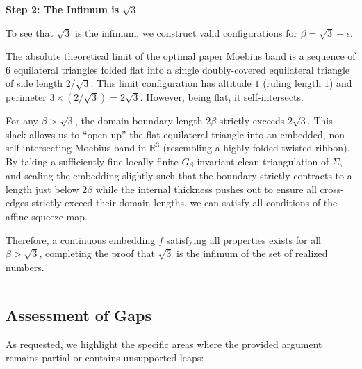 \documentclass[12pt]{article}
\begin{document}
\vspace{1em}

\noindent\textbf{Step 2: The Infimum is $\sqrt{3}$}

\vspace{0.5em}

To see that $\sqrt{3}$ is the infimum, we construct valid configurations for $\beta = \sqrt{3} + \epsilon$.

The absolute theoretical limit of the optimal paper Moebius band is a sequence of $6$ equilateral triangles folded flat into a single doubly-covered equilateral triangle of side length $2/\sqrt{3}$. This limit configuration has altitude $1$ (ruling length $1$) and perimeter $3 \times (2/\sqrt{3}) = 2\sqrt{3}$. However, being flat, it self-intersects.

For any $\beta > \sqrt{3}$, the domain boundary length $2\beta$ strictly exceeds $2\sqrt{3}$. This slack allows us to ``open up'' the flat equilateral triangle into an embedded, non-self-intersecting Moebius band in $\mathbb{R}^3$ (resembling a highly folded twisted ribbon). By taking a sufficiently fine locally finite $G_{\beta}$-invariant clean triangulation of $\Sigma$, and scaling the embedding slightly such that the boundary strictly contracts to a length just below $2\beta$ while the internal thickness pushes out to ensure all cross-edges strictly exceed their domain lengths, we can satisfy all conditions of the affine squeeze map. 

Therefore, a continuous embedding $f$ satisfying all properties exists for all $\beta > \sqrt{3}$, completing the proof that $\sqrt{3}$ is the infimum of the set of realized numbers.

\vspace{2em}
\hrule
\vspace{1em}

\subsection*{Assessment of Gaps}

As requested, we highlight the specific areas where the provided argument remains partial or contains unsupported leaps:
\end{document}
